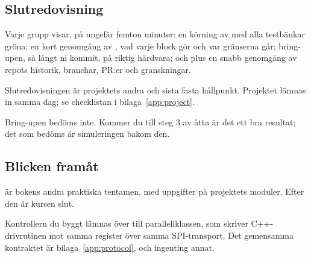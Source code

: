\subsection*{Slutredovisning}
Varje grupp visar, på ungefär femton minuter: en körning av  med alla
testbänkar gröna; en kort genomgång av , vad varje block gör och var gränserna
går; bring-upen, så långt ni kommit, på riktig hårdvara; och  plus en snabb
genomgång av repots historik, branchar, PR:er och granskningar.

Slutredovisningen är projektets andra och sista fasta hållpunkt. Projektet lämnas in samma dag; se
checklistan i bilaga~\ref{app:project}.

Bring-upen bedöms inte. Kommer du till steg 3 av åtta är det ett bra resultat; det som bedöms är
simuleringen bakom den.

\subsection*{Blicken framåt}
 är bokens andra praktiska tentamen, med uppgifter på projektets moduler. Efter den är
kursen slut.

Kontrollern du byggt lämnas över till parallellklassen, som skriver C++-drivrutinen mot samma
register över samma SPI-transport. Det gemensamma kontraktet är bilaga~\ref{app:protocol}, och
ingenting annat.
